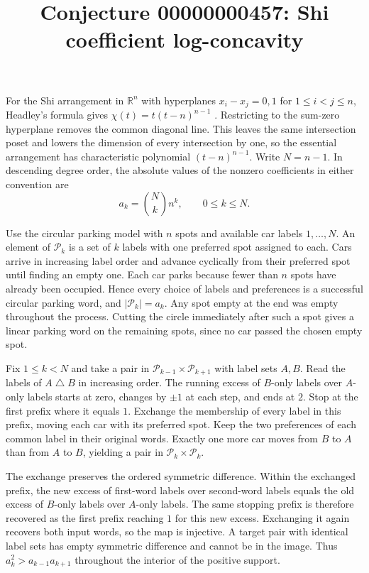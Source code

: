 \documentclass[11pt]{article}
\title{Conjecture 00000000457: Shi coefficient log-concavity}
\author{}
\date{}
\begin{document}
\maketitle

For the Shi arrangement in $\mathbb R^n$ with hyperplanes
$x_i-x_j=0,1$ for $1\le i<j\le n$, Headley's formula gives
$\chi(t)=t(t-n)^{n-1}$ \cite[Section~1]{athanasiadis}.
Restricting to the sum-zero hyperplane removes the common diagonal
line. This leaves the same intersection poset and lowers the
dimension of every intersection by one, so the essential arrangement
has characteristic polynomial $(t-n)^{n-1}$.
Write $N=n-1$. In descending degree order, the absolute values of the
nonzero coefficients in either convention are
\[
 a_k=\binom{N}{k}n^k,\qquad 0\le k\le N.
\]

Use the circular parking model with $n$ spots and available car
labels $1,\ldots,N$. An element of $\mathcal P_k$ is a set of $k$
labels with one preferred spot assigned to each. Cars arrive in
increasing label order and advance cyclically from their preferred
spot until finding an empty one. Each car parks because fewer than
$n$ spots have already been occupied. Hence every choice of labels
and preferences is a successful circular parking word, and
$|\mathcal P_k|=a_k$.
Any spot empty at the end was empty throughout the process. Cutting
the circle immediately after such a spot gives a linear
parking word on the remaining spots, since no car passed the chosen
empty spot.

Fix $1\le k<N$ and take a pair in
$\mathcal P_{k-1}\times\mathcal P_{k+1}$ with label sets $A,B$.
Read the labels of $A\mathbin{\triangle}B$ in increasing order.
The running excess of $B$-only labels over $A$-only labels starts
at zero, changes by $\pm1$ at each step, and ends at $2$. Stop at
the first prefix where it equals $1$. Exchange the membership of
every label in this prefix, moving each car with its preferred
spot. Keep the two preferences of each common label in their
original words. Exactly one more car moves from $B$ to $A$ than
from $A$ to $B$, yielding a pair in
$\mathcal P_k\times\mathcal P_k$.

The exchange preserves the ordered symmetric difference. Within
the exchanged prefix, the new excess of first-word labels over
second-word labels equals the old excess of $B$-only labels over
$A$-only labels. The same stopping prefix is therefore recovered
as the first prefix reaching $1$ for this new excess. Exchanging
it again recovers both input words, so the map is injective.
A target pair with identical label sets has empty symmetric
difference and cannot be in the image. Thus $a_k^2>a_{k-1}a_{k+1}$
throughout the interior of the positive support.
\end{document}
